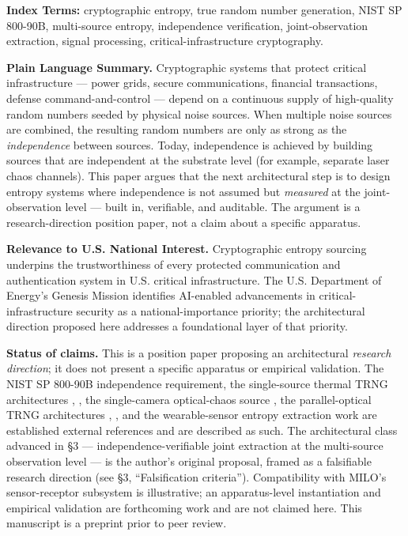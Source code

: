 \textbf{Index Terms:} cryptographic entropy, true random number
generation, NIST SP 800-90B, multi-source entropy, independence
verification, joint-observation extraction, signal processing,
critical-infrastructure cryptography.

\textbf{Plain Language Summary.} Cryptographic systems that protect
critical infrastructure --- power grids, secure communications,
financial transactions, defense command-and-control --- depend on a
continuous supply of high-quality random numbers seeded by physical
noise sources. When multiple noise sources are combined, the resulting
random numbers are only as strong as the \emph{independence} between
sources. Today, independence is achieved by building sources that are
independent at the substrate level (for example, separate laser chaos
channels). This paper argues that the next architectural step is to
design entropy systems where independence is not assumed but
\emph{measured} at the joint-observation level --- built in, verifiable,
and auditable. The argument is a research-direction position paper, not
a claim about a specific apparatus.

\textbf{Relevance to U.S. National Interest.} Cryptographic entropy
sourcing underpins the trustworthiness of every protected communication
and authentication system in U.S. critical infrastructure. The U.S.
Department of Energy's Genesis Mission identifies AI-enabled
advancements in critical-infrastructure security as a
national-importance priority; the architectural direction proposed here
addresses a foundational layer of that priority.

\textbf{Status of claims.} This is a position paper proposing an
architectural \emph{research direction}; it does not present a specific
apparatus or empirical validation. The NIST SP 800-90B \cite{ref1}
independence requirement, the single-source thermal TRNG architectures
\cite{ref2}, \cite{ref3}, the single-camera optical-chaos source \cite{ref4}, the
parallel-optical TRNG architectures \cite{ref5}, \cite{ref6}, and the
wearable-sensor entropy extraction work \cite{ref7} are established external
references and are described as such. The architectural class advanced
in §3 --- independence-verifiable joint extraction at the multi-source
observation level --- is the author's original proposal, framed as a
falsifiable research direction (see §3, ``Falsification criteria'').
Compatibility with MILO's sensor-receptor subsystem \cite{ref8} is
illustrative; an apparatus-level instantiation and empirical validation
are forthcoming work and are not claimed here. This manuscript is a
preprint prior to peer review.

